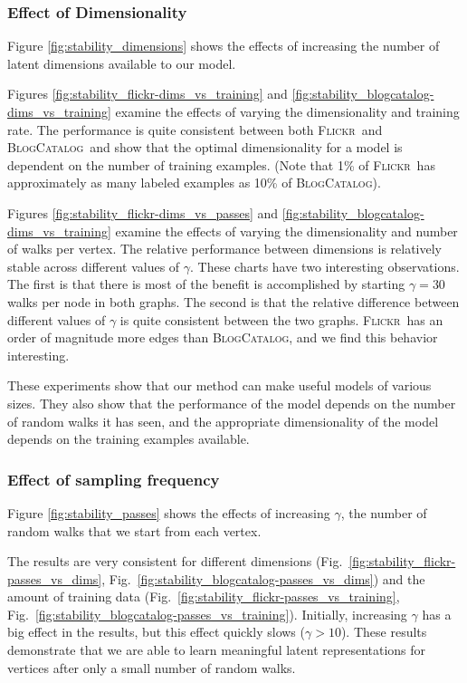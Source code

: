 \documentclass{sig-alternate}
\newcommand{\blogcatalog}{\textsc{BlogCatalog}}
\newcommand{\flickr}{\textsc{Flickr}}
\begin{document}
\subsubsection{Effect of Dimensionality}
Figure \ref{fig:stability_dimensions} shows the effects of increasing the number of latent dimensions available to our model.

Figures \ref{fig:stability_flickr-dims_vs_training} and \ref{fig:stability_blogcatalog-dims_vs_training} examine the effects of varying the dimensionality and training rate.
The performance is quite consistent between both \flickr\ and \blogcatalog\, and show that the optimal dimensionality for a model is dependent on the number of training examples.  (Note that 1\% of \flickr\ has approximately as many labeled examples as 10\% of \blogcatalog).

Figures \ref{fig:stability_flickr-dims_vs_passes} and \ref{fig:stability_blogcatalog-dims_vs_training} examine the effects of varying the dimensionality and number of walks per vertex.
The relative performance between dimensions is relatively stable across different values of $\gamma$.
These charts have two interesting observations.  The first is that there is most of the benefit is accomplished by starting $\gamma = 30$ walks per node in both graphs.
The second is that the relative difference between different values of $\gamma$ is quite consistent between the two graphs.
\flickr\ has an order of magnitude more edges than \blogcatalog, and we find this behavior interesting.

These experiments show that our method can make useful models of various sizes.  They also show that the performance of the model depends on the number of random walks it has seen, and the appropriate dimensionality of the model depends on the training examples available.

\subsubsection{Effect of sampling frequency}
Figure \ref{fig:stability_passes} shows the effects of increasing $\gamma$, the number of random walks that we start from each vertex.  

The results are very consistent for different dimensions (Fig.\ \ref{fig:stability_flickr-passes_vs_dims}, Fig.\ \ref{fig:stability_blogcatalog-passes_vs_dims}) and the amount of training data (Fig.\ \ref{fig:stability_flickr-passes_vs_training}, Fig.\ \ref{fig:stability_blogcatalog-passes_vs_training}).
Initially, increasing $\gamma$ has a big effect in the results, but this effect quickly slows ($\gamma > 10$).
These results demonstrate that we are able to learn meaningful latent representations for vertices after only a small number of random walks.
\end{document}
